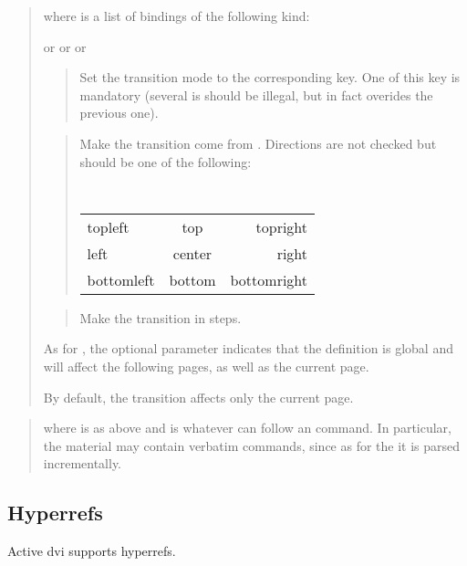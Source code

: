 \documentclass[12pt]{article}
\begin{document}
\docdef \advitransition \doctt {[global]}
\begin{quote}
where  is a list of bindings of the following kind:

 or  or  or 
\begin{quote}
Set the transition mode to the corresponding key.
One of this key is mandatory (several is should be illegal, but in fact
overides the previous one). 
\end{quote}

\begin{quote}
Make the transition come from .  Directions are not checked
but should be one of the following: 
\begin{center}
\tt
\begin{tabular}{l@{\qquad}c@{\qquad}r}
topleft&   top& topright\\
left&  center&  right \\
bottomleft& bottom & bottomright\\
\end{tabular}
\end{center}
\end{quote}

\begin{quote}
Make the transition in  steps. 
\end{quote}
As for \docdef \advibg, the optional parameter  indicates that
the definition is global and will affect the following pages, 
as well as the current page. 

By default, the transition affects only the current page. 
\end{quote}

\medskip\noindent
\docdef \advitransbox {}
\begin{quote}
where  is as above and  is
whatever can follow an \docdef \hbox{} command. In particular, the material
may contain verbatim commands, since as for the \docdef\hbox{} it is 
parsed incrementally.
\end{quote}

\subsection {Hyperrefs}

Active dvi supports hyperrefs. 
\end{document}
